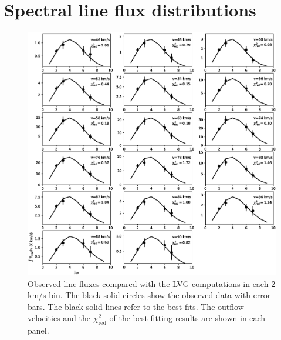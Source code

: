\documentclass[twocolumn]{aastex62}
\begin{document}
\appendix
\section{Spectral line flux distributions}
\begin{figure}[htbp]
\includegraphics[scale=.60]{./fig/SED.eps}
\caption{Observed line fluxes compared with the LVG computations in each 2 km/s bin. The black solid circles show the observed data with error bars. The black solid lines refer to the best fits. The outflow velocities and the $\chi^2_{\mathrm{red}}$ of the best fitting results are shown in each panel. \label{fig:figsed}}
\end{figure}
\end{document}
